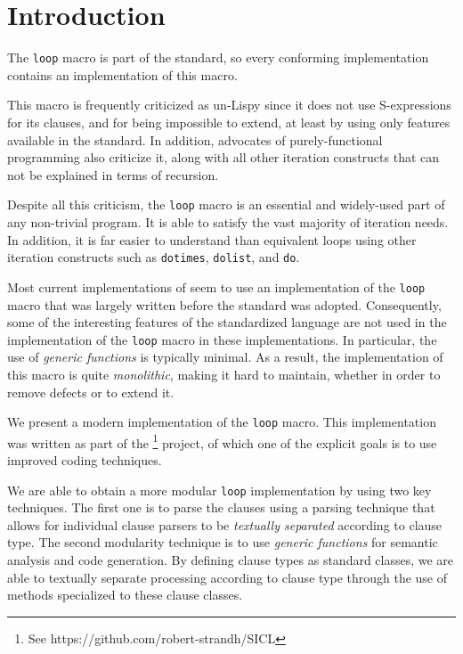 \section{Introduction}
\label{sec-introduction}

The \texttt{loop} macro is part of the \commonlisp{} standard, so
every conforming \commonlisp{} implementation contains an
implementation of this macro. 

This macro is frequently criticized as un-Lispy since it does not use
S-expressions for its clauses, and for being impossible to extend, at
least by using only features available in the \commonlisp{} standard.
In addition, advocates of purely-functional programming also criticize
it, along with all other iteration constructs that can not be
explained in terms of recursion.

Despite all this criticism, the \texttt{loop} macro is an essential
and widely-used part of any non-trivial \commonlisp{} program.  It is
able to satisfy the vast majority of iteration needs.  In addition, it
is far easier to understand than equivalent loops using other
iteration constructs such as \texttt{dotimes}, \texttt{dolist}, and
\texttt{do}.

Most current implementations of \commonlisp{} seem to use an
implementation of the \texttt{loop} macro that was largely written
before the \commonlisp{} standard was adopted.  Consequently, some of
the interesting features of the standardized \commonlisp{} language
are not used in the implementation of the \texttt{loop} macro in
these implementations.  In particular, the use of \emph{generic
  functions} is typically minimal.  As a result, the implementation of
this macro is quite \emph{monolithic}, making it hard to maintain,
whether in order to remove defects or to extend it.

We present a modern implementation of the \texttt{loop} macro.  This
implementation was written as part of the \sicl{}%
\footnote{See https://github.com/robert-strandh/SICL} project, of
which one of the explicit goals is to use improved coding techniques.

We are able to obtain a more modular \texttt{loop} implementation by
using two key techniques.  The first one is to parse the clauses using
a parsing technique that allows for individual clause parsers to be
\emph{textually separated} according to clause type.  The second
modularity technique is to use \emph{generic functions} for semantic
analysis and code generation.  By defining clause types as standard
classes, we are able to textually separate processing according to
clause type through the use of methods specialized to these clause
classes.
